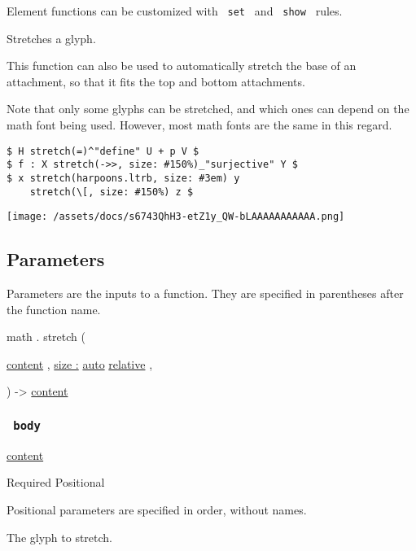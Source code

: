 \label{element-tooltip}
Element functions can be customized with \texttt{\ set\ } and
\texttt{\ show\ } rules.

Stretches a glyph.

This function can also be used to automatically stretch the base of an
attachment, so that it fits the top and bottom attachments.

Note that only some glyphs can be stretched, and which ones can depend
on the math font being used. However, most math fonts are the same in
this regard.

\begin{verbatim}
$ H stretch(=)^"define" U + p V $
$ f : X stretch(->>, size: #150%)_"surjective" Y $
$ x stretch(harpoons.ltrb, size: #3em) y
    stretch(\[, size: #150%) z $
\end{verbatim}

\texttt{[image: /assets/docs/s6743QhH3-etZ1y\_QW-bLAAAAAAAAAAA.png]}

\subsection{\texorpdfstring{{ Parameters
}}{ Parameters }}\label{parameters}

\label{parameters-tooltip}
Parameters are the inputs to a function. They are specified in
parentheses after the function name.

math { . } { stretch } (

{ \href{/docs/reference/foundations/content/}{content} , } {
\hyperref[parameters-size]{size :}
\href{/docs/reference/foundations/auto/}{auto}
\href{/docs/reference/layout/relative/}{relative} , }

) -\textgreater{} \href{/docs/reference/foundations/content/}{content}

\subsubsection{\texorpdfstring{\texttt{\ body\ }}{ body }}\label{parameters-body}

\href{/docs/reference/foundations/content/}{content}

{Required} {{ Positional }}

\label{parameters-body-positional-tooltip}
Positional parameters are specified in order, without names.

The glyph to stretch.

